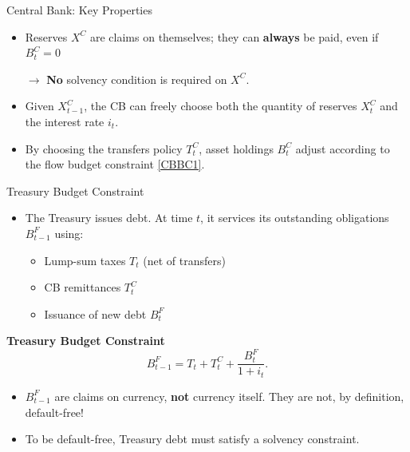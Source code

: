 \documentclass[11pt,aspectratio=169]{beamer}
\begin{document}
\begin{frame}{Central Bank: Key Properties}

\begin{itemize}
    \item Reserves $X^{C}$ are claims on themselves; they can \textbf{always} be paid, even if $B_t^C = 0$ 
    
    $\longrightarrow$   \textbf{No} solvency condition is required on $X^{C}$. 
    \vspace{0.25cm}
    \item Given $X_{t-1}^C$, the CB can freely choose both the quantity of reserves $X_t^C$ and the interest rate $i_t$.
    \vspace{0.25cm}
    \item By choosing the transfers policy $T_t^C$, asset holdings $B_t^C$ adjust according to the flow budget constraint \eqref{CBBC1}.

\end{itemize}

\end{frame}

    \begin{frame}{Treasury Budget Constraint}
    
    \begin{itemize}
    \item The Treasury issues debt. At time $t$, it services its outstanding obligations $B_{t-1}^{F}$ using:
    \vspace{-0.2cm}
    \begin{itemize}
            \item Lump-sum taxes $T_t$ (net of transfers)
            \item CB remittances $T_t^C$
            \item Issuance of new debt $B_t^F$
        \end{itemize}
    \end{itemize}
    
    \vspace{0.25cm}
    \noindent\textbf{Treasury Budget Constraint}
    \begin{equation}
    B_{t-1}^{F} = T_t + T_t^C + \frac{B_t^F}{1+i_t}.
    \label{BudgetT}
    \end{equation}
    
    \begin{itemize}
        \item $B_{t-1}^{F}$ are claims on currency, \textbf{not} currency itself. They are not, by definition, default-free!
        \vspace{0.25cm}
        \item To be default-free, Treasury debt must satisfy a solvency constraint.
    \end{itemize}
    
    \end{frame}
    
\end{document}
